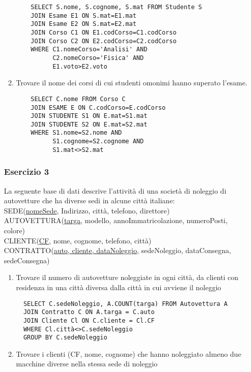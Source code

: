 \documentclass[a4paper]{article}
\begin{document}
\begin{enumerate}
\begin{enumerate}
  \begin{verbatim}
    SELECT S.nome, S.cognome, S.mat FROM Studente S
    JOIN Esame E1 ON S.mat=E1.mat
    JOIN Esame E2 ON S.mat=E2.mat
    JOIN Corso C1 ON E1.codCorso=C1.codCorso
    JOIN Corso C2 ON E2.codCorso=C2.codCorso
    WHERE C1.nomeCorso='Analisi' AND
          C2.nomeCorso='Fisica' AND
          E1.voto>E2.voto
  \end{verbatim}
  \item Trovare il nome dei corsi di cui studenti omonimi hanno superato l'esame.
  \begin{verbatim}
    SELECT C.nome FROM Corso C
    JOIN ESAME E ON C.codCorso=E.codCorso
    JOIN STUDENTE S1 ON E.mat=S1.mat
    JOIN STUDENTE S2 ON E.mat=S2.mat
    WHERE S1.nome=S2.nome AND
          S1.cognome=S2.cognome AND
          S1.mat<>S2.mat
  \end{verbatim}
\end{enumerate}\par \subsubsection{Esercizio 3}
La seguente base di dati descrive l'attività di una società di noleggio di autovetture che ha diverse sedi in alcune città italiane:\medskip\\
SEDE(\underline{nomeSede}, Indirizzo, città, telefono, direttore)\\
AUTOVETTURA(\underline{targa}, modello, annoImmatricolazione, numeroPosti, colore)\\
CLIENTE(\underline{CF}, nome, cognome, telefono, città)\\
CONTRATTO(\underline{auto, cliente, dataNoleggio}, sedeNoleggio, dataConsegna, sedeConsegna)\par \begin{enumerate}
  \item Trovare il numero di autovetture noleggiate in ogni città, da clienti con residenza in una città diversa dalla città in cui avviene il noleggio
  \begin{verbatim}
  SELECT C.sedeNoleggio, A.COUNT(targa) FROM Autovettura A
  JOIN Contratto C ON A.targa = C.auto
  JOIN Cliente Cl ON C.cliente = Cl.CF
  WHERE Cl.città<>C.sedeNoleggio
  GROUP BY C.sedeNoleggio
  \end{verbatim}
  \item Trovare i clienti (CF, nome, cognome) che hanno noleggiato almeno due macchine diverse nella stessa sede di noleggio
  \begin{verbatim}

\end{verbatim}
\end{enumerate}
\end{enumerate}
\end{document}
